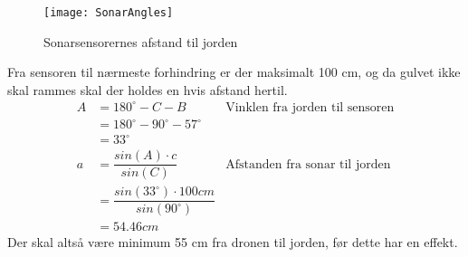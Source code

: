 \documentclass[Main]{subfiles}
\begin{document}
\begin{figure}[H]
\centering
	\texttt{[image: SonarAngles]}
	\caption{Sonarsensorernes afstand til jorden}
	\label{Fig:SonarAngles}
\end{figure}

Fra sensoren til nærmeste forhindring er der maksimalt 100 cm, og da gulvet ikke skal rammes skal der holdes en hvis afstand hertil.
\vspace{-10 pt}
\begin{align*}
A &= 180^\circ - C - B & \text{Vinklen fra jorden til sensoren}\\
	&= 180^\circ - 90^\circ - 57^\circ\\
	&= 33 ^\circ\\
a &= \dfrac{sin(A) \cdot c}{sin(C)} & \text{Afstanden fra sonar til jorden}\\
 	&= \dfrac{sin(33^\circ) \cdot 100cm}{sin(90^\circ)} \\
	&= 54.46 cm
\end{align*}
Der skal altså være minimum 55 cm fra dronen til jorden, før dette har en effekt.
\end{document}
